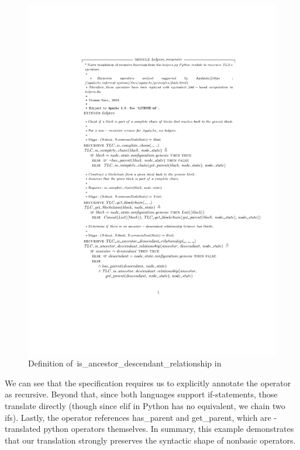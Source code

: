 \begin{figure}
  \includegraphics[width=\textwidth]{images/ancestor_descendant.pdf}
  \caption{Definition
    of~\textsf{is\_ancestor\_descendant\_relationship} in \tlap{}}\label{tla_adr}
\end{figure}

We can see that the \tlap{} specification requires us to explicitly annotate the operator as recursive. 
Beyond that, since both languages support if-statements, those translate directly (though since \textsf{elif} in Python has no equivalent, we chain two ifs). 
Lastly, the \tlap{} operator references \textsf{has\_parent} and \textsf{get\_parent}, which are \tlap{}-translated python operators themselves. 
In summary, this example demonstrates that our translation strongly preserves the syntactic shape of nonbasic operators.
